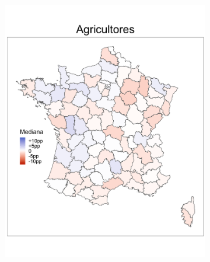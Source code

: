 \begin{figure}
	\centering
	\begin{subfigure}{0.235\textwidth}
	\includegraphics[width = \textwidth]{Figs/Efectos/Mapa_Efectos_CSP1_Modelo_H}
	\end{subfigure}
	~
	\begin{subfigure}{0.235\textwidth}

\end{subfigure}
\end{figure}
